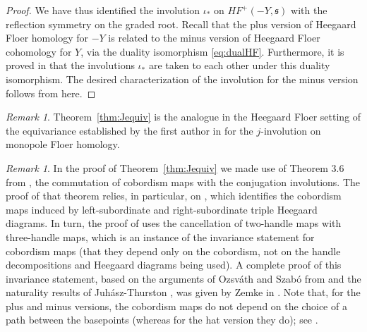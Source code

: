 \documentclass[11 pt]{amsart}
\theoremstyle{remark}
\newtheorem {remark}[theorem]{Remark}
\def\s{\mathfrak s}
\def\HF {\mathit{HF}}
\newcommand\HFp {\HF^+}
\def\inv{\iota}
\begin{document}
\begin{proof}
We have thus identified the involution $\inv_*$ on $\HFp(-Y, \s)$ with the reflection symmetry on the graded root. Recall that the plus version of Heegaard Floer homology for $-Y$ is related to the minus version of Heegaard Floer cohomology for $Y$, via the duality isomorphism \eqref{eq:dualHF}. Furthermore, it is proved in \cite[Section 4.2]{HMinvolutive} that the involutions $\inv_*$ are taken to each other under this duality isomorphism. The desired characterization of the involution for the minus version follows from here.
\end{proof}

\begin{remark}
Theorem~\ref{thm:Jequiv} is the analogue in the Heegaard Floer setting of the equivariance established by the first author in \cite{Dai} for the $j$-involution on monopole Floer homology.
\end{remark}

\begin{remark}
In the proof of Theorem~\ref{thm:Jequiv} we made use of Theorem 3.6 from \cite{HolDiskFour}, the 
commutation of cobordism maps with the conjugation involutions. The proof of that theorem relies, in particular, on \cite[Lemma 5.2]{HolDiskFour}, which identifies the cobordism maps induced by left-subordinate and right-subordinate triple Heegaard diagrams. In turn, the proof of \cite[Lemma 5.2]{HolDiskFour} uses the cancellation of two-handle maps with three-handle maps, which is an instance of the invariance statement for cobordism maps (that they depend only on the cobordism, not on the handle decompositions and Heegaard diagrams being used). A complete proof of this invariance statement, based on the arguments of Ozsv\'ath and Szab\'o from \cite{HolDiskFour} and the naturality results of Juh\'asz-Thurston \cite{Naturality}, was given by Zemke in \cite{Zemke2}. Note that, for the plus and minus versions, the cobordism maps do not depend on the choice of a path between the basepoints (whereas for the hat version they do); see \cite[Theorem G]{Zemke2}.
\end{remark}



\end{document}
